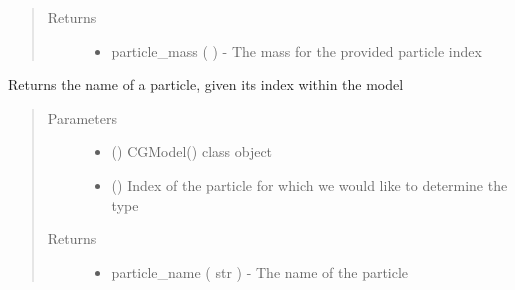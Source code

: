 \documentclass[letterpaper,12pt,english,openany,oneside]{sphinxmanual}
\begin{document}
\begin{fulllineitems}
\begin{fulllineitems}
\begin{quote}
\begin{description}
\begin{itemize}
\end{itemize}

\item[{Returns}] \leavevmode
\begin{itemize}
\item {} 
particle\_mass (  ) - The mass for the provided particle index

\end{itemize}


\end{description}\end{quote}

\end{fulllineitems}


\begin{fulllineitems}
\label{\detokenize{cg_model:cg_model.cgmodel.CGModel.get_particle_name}}
Returns the name of a particle, given its index within the model
\begin{quote}\begin{description}
\item[{Parameters}] \leavevmode\begin{itemize}
\item {} 
 () \textendash{} CGModel() class object

\item {} 
 () \textendash{} Index of the particle for which we would like to determine the type

\end{itemize}

\item[{Returns}] \leavevmode
\begin{itemize}
\item {} 
particle\_name ( str ) - The name of the particle

\end{itemize}



\end{description}
\end{quote}
\end{fulllineitems}
\end{fulllineitems}
\end{document}
